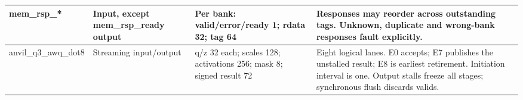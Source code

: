 \documentclass[11pt,a4paper]{article}
\begin{document}
{\begin{longtable}{@{}L{0.21\textwidth}|L{0.12\textwidth}|L{0.12\textwidth}|L{0.45\textwidth}@{}}
mem\_\allowbreak{}rsp\_\allowbreak{}*\allowbreak{} & Input,\allowbreak{} except mem\_\allowbreak{}rsp\_\allowbreak{}ready output & Per bank: valid/\allowbreak{}error/\allowbreak{}ready 1; rdata 32; tag 64 & Responses may reorder across outstanding tags. Unknown,\allowbreak{} duplicate and wrong-bank responses fault explicitly.\\[2pt]\hline

anvil\_\allowbreak{}q3\_\allowbreak{}awq\_\allowbreak{}dot8 & Streaming input/\allowbreak{}output & q/\allowbreak{}z 32 each; scales 128; activations 256; mask 8; signed result 72 & Eight logical lanes. E0 accepts; E7 publishes the unstalled result; E8 is earliest retirement. Initiation interval is one. Output stalls freeze all stages; synchronous flush discards valids.\\[2pt]\hline

\bottomrule\end{longtable}}
\end{document}
